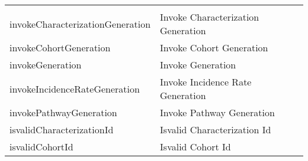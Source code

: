 \documentclass[
]{article}
\begin{document}
\begin{longtable}[]{@{}ll@{}}
\begin{minipage}[t]{0.48\columnwidth}
\end{minipage}\tabularnewline
\begin{minipage}[t]{0.46\columnwidth}\raggedright
invokeCharacterizationGeneration\strut
\end{minipage} & \begin{minipage}[t]{0.48\columnwidth}\raggedright
Invoke Characterization Generation\strut
\end{minipage}\tabularnewline
\begin{minipage}[t]{0.46\columnwidth}\raggedright
invokeCohortGeneration\strut
\end{minipage} & \begin{minipage}[t]{0.48\columnwidth}\raggedright
Invoke Cohort Generation\strut
\end{minipage}\tabularnewline
\begin{minipage}[t]{0.46\columnwidth}\raggedright
invokeGeneration\strut
\end{minipage} & \begin{minipage}[t]{0.48\columnwidth}\raggedright
Invoke Generation\strut
\end{minipage}\tabularnewline
\begin{minipage}[t]{0.46\columnwidth}\raggedright
invokeIncidenceRateGeneration\strut
\end{minipage} & \begin{minipage}[t]{0.48\columnwidth}\raggedright
Invoke Incidence Rate Generation\strut
\end{minipage}\tabularnewline
\begin{minipage}[t]{0.46\columnwidth}\raggedright
invokePathwayGeneration\strut
\end{minipage} & \begin{minipage}[t]{0.48\columnwidth}\raggedright
Invoke Pathway Generation\strut
\end{minipage}\tabularnewline
\begin{minipage}[t]{0.46\columnwidth}\raggedright
isvalidCharacterizationId\strut
\end{minipage} & \begin{minipage}[t]{0.48\columnwidth}\raggedright
Isvalid Characterization Id\strut
\end{minipage}\tabularnewline
\begin{minipage}[t]{0.46\columnwidth}\raggedright
isvalidCohortId\strut
\end{minipage} & \begin{minipage}[t]{0.48\columnwidth}\raggedright
Isvalid Cohort Id\strut
\end{minipage}\tabularnewline

\end{longtable}
\end{document}
